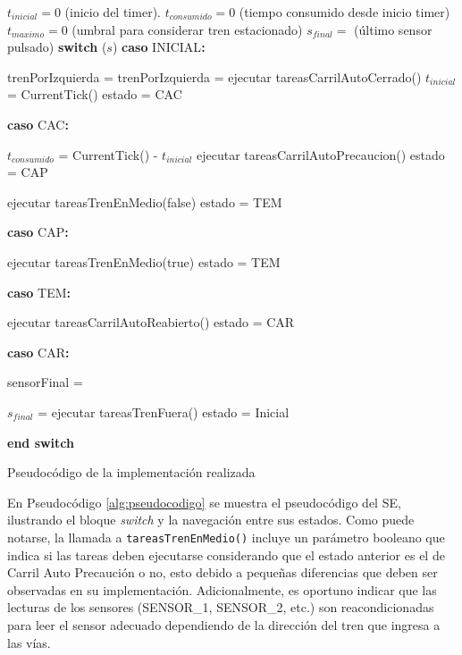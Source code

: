 \documentclass[journal]{IEEEtran}
\makeatletter
\newcommand{\SWITCH}[1]{\STATE \textbf{switch} (#1)}
\newcommand{\ENDSWITCH}{\STATE \textbf{end switch}}
\newcommand{\CASE}[1]{\STATE \textbf{caso} #1\textbf{:} \begin{ALC@g}}
\newcommand{\ENDCASE}{\end{ALC@g}}
\makeatother
\begin{document}
\begin{algorithm}
\begin{algorithmic}[1]

\STATE $t_{inicial} = 0$ (inicio del timer).
\STATE $t_{consumido} = 0$ (tiempo consumido desde inicio timer)
\STATE $t_{maximo} = 0$ (umbral para considerar tren estacionado)
\STATE $s_{final} = $ \FALSE (último sensor pulsado)
\WHILE {\TRUE}
	\SWITCH{$s$}
		\CASE{INICIAL}
					\STATE trenPorIzquierda = \TRUE
				\ELSE
					\STATE trenPorIzquierda = \FALSE
				\ENDIF
				\STATE ejecutar tareasCarrilAutoCerrado()
				\STATE $t_{inicial}$ = CurrentTick()
				\STATE estado = CAC
			\ENDIF
	    \ENDCASE

	    \CASE{CAC}
	    	\STATE $t_{consumido}$ = CurrentTick() - $t_{inicial}$
              \STATE ejecutar tareasCarrilAutoPrecaucion()
              \STATE estado = CAP
           	\ENDIF

           		\STATE ejecutar tareasTrenEnMedio(false)
           		\STATE estado = TEM
            \ENDIF
	    \ENDCASE

	    \CASE{CAP}
	    	\IF{SENSOR\_2}
	    		\STATE ejecutar tareasTrenEnMedio(true)
	    		\STATE estado = TEM
	    	\ENDIF
	    \ENDCASE
	    
	    \CASE{TEM}
	    	\IF{SENSOR\_3}
	    		\STATE ejecutar tareasCarrilAutoReabierto()
	    		\STATE estado = CAR
	    	\ENDIF
	    \ENDCASE

	    \CASE{CAR}
	    	\IF{SENSOR\_4}
	    		\STATE sensorFinal = \TRUE
	    	\ENDIF

	    		\STATE $s_{final}$ = \FALSE
	    		\STATE ejecutar tareasTrenFuera()
	    		\STATE estado = Inicial
	    	\ENDIF
	    \ENDCASE

    \ENDSWITCH
\ENDWHILE

\end{algorithmic}
\caption{Pseudocódigo de la implementación realizada}
\label{alg:pseudocodigo}
\end{algorithm}

En Pseudocódigo \ref{alg:pseudocodigo} se muestra el pseudocódigo del SE, ilustrando el bloque \emph{switch} y la navegación entre sus estados.
Como puede notarse, la llamada a \texttt{tareasTrenEnMedio()} incluye un parámetro booleano que indica si las tareas deben ejecutarse considerando que el estado anterior es el de Carril Auto Precaución o no, esto debido a pequeñas diferencias que deben ser observadas en su implementación.
Adicionalmente, es oportuno indicar que las lecturas de los sensores (SENSOR\_1, SENSOR\_2, etc.) son reacondicionadas para leer el sensor adecuado dependiendo de la dirección del tren que ingresa a las vías.
\end{document}
